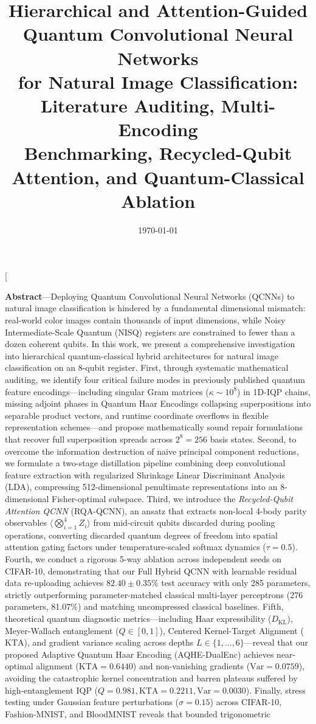 \documentclass[10pt,twocolumn,twoside,a4paper]{article}
\title{\vspace{-0.5cm}\textbf{\Large Hierarchical and Attention-Guided Quantum Convolutional Neural Networks}\\[3pt]
\textbf{\Large for Natural Image Classification: Literature Auditing, Multi-Encoding}\\[3pt]
\textbf{\Large Benchmarking, Recycled-Qubit Attention, and Quantum-Classical Ablation}}
\author{
\textbf{Monis Husain}$^{1}$ \qquad \textbf{Soumya}$^{1}$ \qquad \textbf{Ahan}$^{1}$ \qquad \textbf{Ankita Bansal}$^{2,*}\\[4pt]
\small $^{1,2}$Department of Information Technology, Netaji Subhas University of Technology (NSUT)\\[2pt]
\small Sector-3, Dwarka, New Delhi 110078, India\\[3pt]
\small $^{*}$Corresponding author: \texttt{ankita.bansal@nsut.ac.in}
}
\date{\today}
\begin{document}
\twocolumn[{%
  \maketitle
  \thispagestyle{plain}
  \vspace{-0.4cm}
  \begin{center}
    \begin{minipage}{0.92\textwidth}
      \small
      \textbf{Abstract}---Deploying Quantum Convolutional Neural Networks (QCNNs) to natural image classification is hindered by a fundamental dimensional mismatch: real-world color images contain thousands of input dimensions, while Noisy Intermediate-Scale Quantum (NISQ) registers are constrained to fewer than a dozen coherent qubits. In this work, we present a comprehensive investigation into hierarchical quantum-classical hybrid architectures for natural image classification on an 8-qubit register. First, through systematic mathematical auditing, we identify four critical failure modes in previously published quantum feature encodings---including singular Gram matrices ($\kappa \sim 10^8$) in 1D-IQP chains, missing adjoint phases in Quantum Haar Encodings collapsing superpositions into separable product vectors, and runtime coordinate overflows in flexible representation schemes---and propose mathematically sound repair formulations that recover full superposition spreads across $2^8 = 256$ basis states. Second, to overcome the information destruction of naive principal component reductions, we formulate a two-stage distillation pipeline combining deep convolutional feature extraction with regularized Shrinkage Linear Discriminant Analysis (LDA), compressing 512-dimensional penultimate representations into an 8-dimensional Fisher-optimal subspace. Third, we introduce the \textit{Recycled-Qubit Attention QCNN} (RQA-QCNN), an ansatz that extracts non-local 4-body parity observables $\langle \bigotimes_{i=1}^4 Z_i \rangle$ from mid-circuit qubits discarded during pooling operations, converting discarded quantum degrees of freedom into spatial attention gating factors under temperature-scaled softmax dynamics ($\tau=0.5$). Fourth, we conduct a rigorous 5-way ablation across independent seeds on CIFAR-10, demonstrating that our Full Hybrid QCNN with learnable residual data re-uploading achieves $82.40 \pm 0.35$\% test accuracy with only 285 parameters, strictly outperforming parameter-matched classical multi-layer perceptrons (276 parameters, 81.07\%) and matching uncompressed classical baselines. Fifth, theoretical quantum diagnostic metrics---including Haar expressibility ($D_{\text{KL}}$), Meyer-Wallach entanglement ({$Q \in [0, 1]$}), Centered Kernel-Target Alignment ($\text{KTA}$), and gradient variance scaling across depths {$L \in \{1, \dots, 6\}$}---reveal that our proposed Adaptive Quantum Haar Encoding (AQHE-DualEnc) achieves near-optimal alignment ($\text{KTA}=0.6440$) and non-vanishing gradients ($\text{Var}=0.0759$), avoiding the catastrophic kernel concentration and barren plateaus suffered by high-entanglement IQP ($Q=0.981, \text{KTA}=0.2211, \text{Var}=0.0030$). Finally, stress testing under Gaussian feature perturbations ($\sigma=0.15$) across CIFAR-10, Fashion-MNIST, and BloodMNIST reveals that bounded trigonometric 
\end{minipage}
\end{center}}
\end{document}
